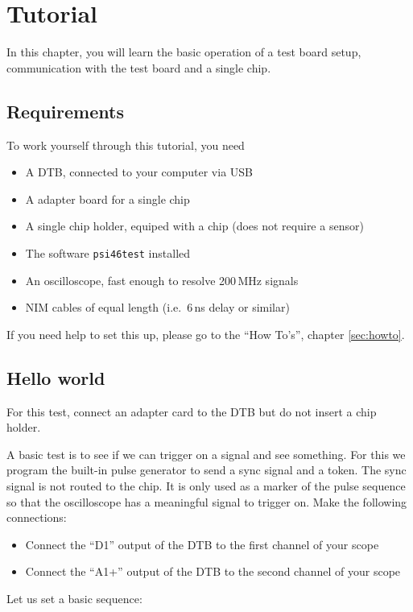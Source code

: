 \chapter{Tutorial}
In this chapter, you will learn the basic operation of a test board setup, communication with the test board and a single chip.

\section{Requirements}
To work yourself through this tutorial, you need
\begin{itemize}
    \item A DTB, connected to your computer via USB
    \item A adapter board for a single chip
    \item A single chip holder, equiped with a chip (does not require a sensor)
    \item The software \texttt{psi46test} installed
    \item An oscilloscope, fast enough to resolve 200\,MHz signals
    \item NIM cables of equal length (i.e.\, 6\,ns delay or similar)
\end{itemize}

If you need help to set this up, please go to the \enquote{How To's}, chapter \ref{sec:howto}.


\section{Hello world}
For this test, connect an adapter card to the DTB but do not insert a chip holder.


A basic test is to see if we can trigger on a signal and see something. For this we program the built-in pulse generator to send a sync signal and a token. The sync signal is not routed to the chip. It is only used as a marker of the pulse sequence so that the oscilloscope has a meaningful signal to trigger on. Make the following connections:
\begin{itemize}
    \item Connect the \enquote{D1} output of the DTB to the first channel of your scope
    \item Connect the \enquote{A1+} output of the DTB to the second channel of your scope
\end{itemize}
Let us set a basic sequence:

